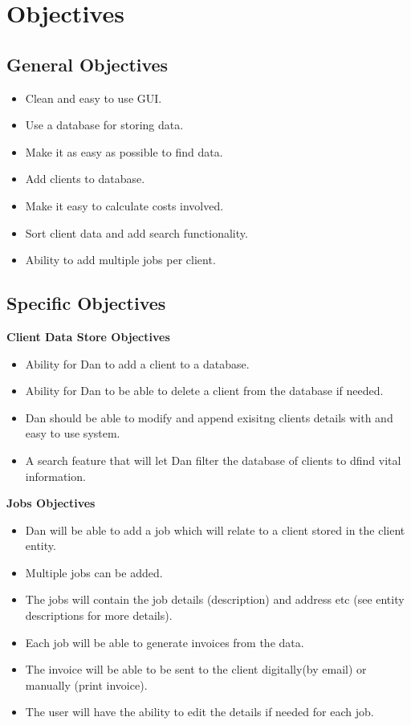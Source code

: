 \section{Objectives}

\subsection{General Objectives}

	\begin{itemize}
		\item Clean and easy to use GUI.
		\item Use a database for storing data.
		\item Make it as easy as possible to find data.
		\item Add clients to database.
		\item Make it easy to calculate costs involved.
		\item Sort client data and add search functionality.
		\item Ability to add multiple jobs per client.
	\end{itemize}

\subsection{Specific Objectives}
	
	\textbf{Client Data Store Objectives}
	\begin{itemize}
		\item Ability for Dan to add a client to a database.
		\item Ability for Dan to be able to delete a client from the database if needed.
		\item Dan should be able to modify and append exisitng clients details with and easy to use system.
		\item A search feature that will let Dan filter the database of clients to dfind vital information.

	\end{itemize}
	
	\textbf{Jobs Objectives}
	\begin{itemize}
		\item Dan will be able to add a job which will relate to a client stored in the client entity.
		\item Multiple jobs can be added.
		\item The jobs will contain the job details (description) and address etc (see entity descriptions for more details).
		\item Each job will be able to generate invoices from the data.
		\item The invoice will be able to be sent to the client digitally(by email) or manually (print invoice).
		\item The user will have the ability to edit the details if needed for each job.
	
	\end{itemize}
	

